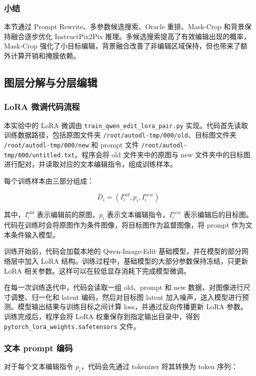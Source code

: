 \documentclass[UTF8,11pt,a4paper,fontset=fandol]{ctexart}
\begin{document}
\subsubsection{小结}

本节通过 Prompt Rewrite、多参数候选搜索、Oracle 重排、Mask-Crop 和背景保持融合逐步优化 InstructPix2Pix 推理。多候选搜索提高了有效编辑出现的概率，Mask-Crop 强化了小目标编辑，背景融合改善了非编辑区域保持，但也带来了额外计算开销和掩膜依赖。


\subsection{图层分解与分层编辑}

\subsubsection{LoRA 微调代码流程}

本实验中的 LoRA 微调由 \texttt{train\_qwen\_edit\_lora\_pair.py} 实现。代码首先读取训练数据路径，包括原图文件夹 \texttt{/root/autodl-tmp/000/old}、目标图文件夹 \texttt{/root/autodl-tmp/000/new} 和 prompt 文件 \texttt{/root/autodl-tmp/000/untitled.txt}。程序会将 old 文件夹中的原图与 new 文件夹中的目标图进行配对，并读取对应的文本编辑指令，组成训练样本。

每个训练样本由三部分组成：

\[
D_i = (I_i^{old}, p_i, I_i^{new})
\]

其中，\(I_i^{old}\) 表示编辑前的原图，\(p_i\) 表示文本编辑指令，\(I_i^{new}\) 表示编辑后的目标图。代码在训练时会将原图作为条件图像，将目标图作为监督图像，将 prompt 作为文本条件输入模型。

训练开始前，代码会加载本地的 Qwen-Image-Edit 基础模型，并在模型的部分网络层中加入 LoRA 结构。训练过程中，基础模型的大部分参数保持冻结，只更新 LoRA 相关参数。这样可以在较低显存消耗下完成模型微调。

在每一次训练迭代中，代码会读取一组 old、prompt 和 new 数据，对图像进行尺寸调整、归一化和 latent 编码，然后对目标图 latent 加入噪声，送入模型进行预测。模型输出结果与训练目标之间计算 loss，并通过反向传播更新 LoRA 参数。训练完成后，程序会将 LoRA 权重保存到指定输出目录中，得到 \texttt{pytorch\_lora\_weights.safetensors} 文件。

\subsubsection{文本 prompt 编码}

对于每个文本编辑指令 \(p_i\)，代码会先通过 tokenizer 将其转换为 token 序列：
\end{document}
